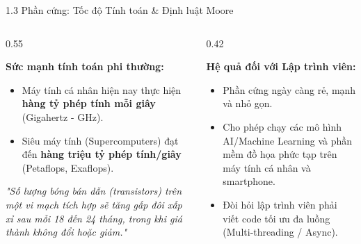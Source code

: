 \documentclass[aspectratio=169, 10pt]{beamer}
\begin{document}
\begin{frame}{1.3 Phần cứng: Tốc độ Tính toán \& Định luật Moore}
  \begin{columns}[c]
    \begin{column}{0.55\textwidth}
      \begin{block}{\textbf{Sức mạnh tính toán phi thường:}}
        \begin{itemize}
          \item Máy tính cá nhân hiện nay thực hiện \textbf{hàng tỷ phép tính mỗi giây} (Gigahertz - GHz).
          \item Siêu máy tính (Supercomputers) đạt đến \textbf{hàng triệu tỷ phép tính/giây} (Petaflops, Exaflops).
        \end{itemize}
      \end{block}
      \begin{tcolorbox}[colback=UniLightBlue,colframe=UniBlue,title=\textbf{Định luật Moore (Gordon Moore - 1965)}]
        \textit{"Số lượng bóng bán dẫn (transistors) trên một vi mạch tích hợp sẽ tăng gấp đôi xấp xỉ sau mỗi 18 đến 24 tháng, trong khi giá thành không đổi hoặc giảm."}
      \end{tcolorbox}
    \end{column}
    \begin{column}{0.42\textwidth}
      \begin{alertblock}{\textbf{Hệ quả đối với Lập trình viên:}}
        \begin{itemize}
          \item Phần cứng ngày càng rẻ, mạnh và nhỏ gọn.
          \item Cho phép chạy các mô hình AI/Machine Learning và phần mềm đồ họa phức tạp trên máy tính cá nhân và smartphone.
          \item Đòi hỏi lập trình viên phải viết code tối ưu đa luồng (Multi-threading / Async).
        \end{itemize}
      \end{alertblock}
    \end{column}
  \end{columns}
\end{frame}
\end{document}

